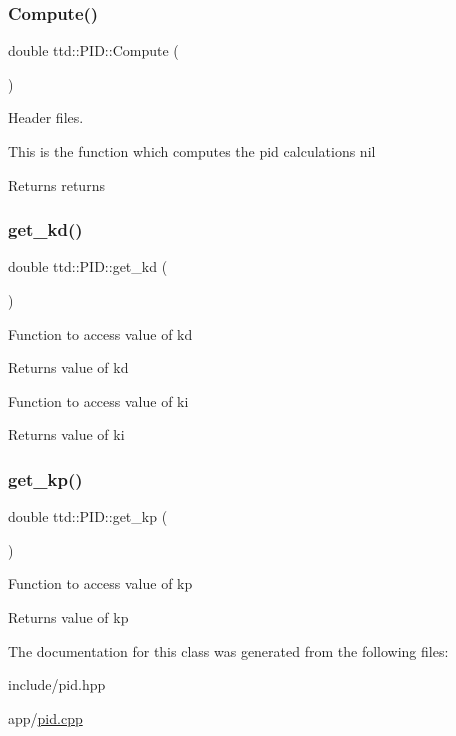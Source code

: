 \subsubsection{\texorpdfstring{Compute()}{Compute()}}
{\footnotesize\ttfamily double ttd\+::\+P\+I\+D\+::\+Compute (\begin{DoxyParamCaption}{ }\end{DoxyParamCaption})}



Header files. 

This is the function which computes the pid calculations  nil \begin{DoxyReturn}{Returns}
returns 
\end{DoxyReturn}
\mbox{\label{classttd_1_1PID_a84e6add940d84fab262f98a835cdb97a}} 
\subsubsection{\texorpdfstring{get\+\_\+kd()}{get\_kd()}}
{\footnotesize\ttfamily double ttd\+::\+P\+I\+D\+::get\+\_\+kd (\begin{DoxyParamCaption}{ }\end{DoxyParamCaption})}

Function to access value of kd \begin{DoxyReturn}{Returns}
value of kd 
\end{DoxyReturn}
Function to access value of ki \begin{DoxyReturn}{Returns}
value of ki
\end{DoxyReturn}
\mbox{\label{classttd_1_1PID_a21a0403413a68aa1da98a75257dbde8a}} 
\subsubsection{\texorpdfstring{get\+\_\+kp()}{get\_kp()}}
{\footnotesize\ttfamily double ttd\+::\+P\+I\+D\+::get\+\_\+kp (\begin{DoxyParamCaption}{ }\end{DoxyParamCaption})}

Function to access value of kp \begin{DoxyReturn}{Returns}
value of kp 
\end{DoxyReturn}


The documentation for this class was generated from the following files\+:\begin{DoxyCompactItemize}
\item 
include/pid.\+hpp\item 
app/\hyperlink{pid_8cpp}{pid.\+cpp}\end{DoxyCompactItemize}
